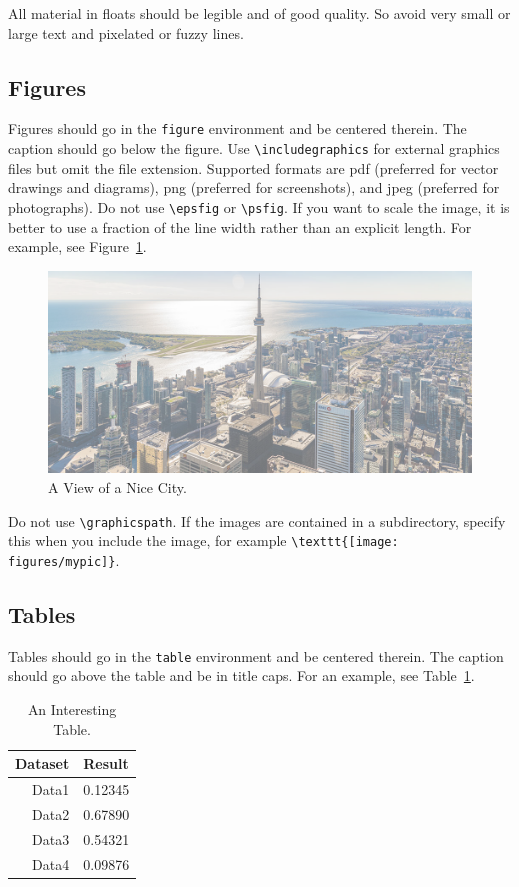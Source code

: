 \documentclass{uai2021} %
\begin{document}
All material in floats should be legible and of good quality.
So avoid very small or large text and pixelated or fuzzy lines.

\subsection{Figures}\label{sec:figures}
Figures should go in the \texttt{figure} environment and be centered therein.
The caption should go below the figure.
Use \verb|\includegraphics| for external graphics files but omit the file extension.
Supported formats are \textsf{pdf} (preferred for vector drawings and diagrams), \textsf{png} (preferred for screenshots), and \textsf{jpeg} (preferred for photographs).
Do not use \verb|\epsfig| or \verb|\psfig|.
If you want to scale the image, it is better to use a fraction of the line width rather than an explicit length.
For example, see Figure~\ref{fig:toronto}.
\begin{figure}
  \centering
  \includegraphics[width=0.7\linewidth,page=3]{toronto}
  \caption{A View of a Nice City.}\label{fig:toronto}
\end{figure}

Do not use \verb|\graphicspath|.
If the images are contained in a subdirectory, specify this when you include the image, for example \verb|\texttt{[image: figures/mypic]}|.

\subsection{Tables}\label{sec:tables}
Tables should go in the \texttt{table} environment and be centered therein.
The caption should go above the table and be in title caps.
For an example, see Table~\ref{tab:data}.
\begin{table}
    \centering
    \caption{An Interesting Table.}\label{tab:data}
    \begin{tabular}{rl}
      \toprule %
      \bfseries Dataset & \bfseries Result\\
      \midrule %
      Data1 & 0.12345\\
      Data2 & 0.67890\\
      Data3 & 0.54321\\
      Data4 & 0.09876\\
      \bottomrule %
    \end{tabular}
\end{table}
\end{document}
